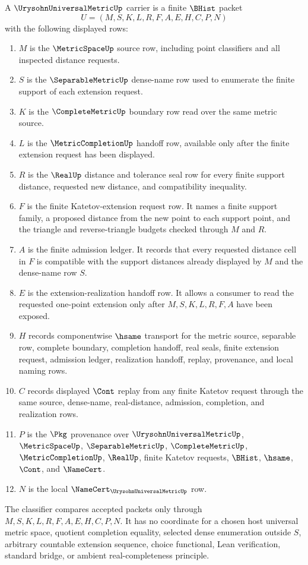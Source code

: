 \begin{definition}\label{def:urysohn-universal-metric-finite-extension-carrier}
A $\UrysohnUniversalMetricUp$ carrier is a finite $\BHist$ packet
$$
U=(M,S,K,L,R,F,A,E,H,C,P,N)
$$
with the following displayed rows:
\begin{enumerate}
\item $M$ is the $\MetricSpaceUp$ source row, including point classifiers and all inspected distance requests.
\item $S$ is the $\SeparableMetricUp$ dense-name row used to enumerate the finite support of each extension request.
\item $K$ is the $\CompleteMetricUp$ boundary row read over the same metric source.
\item $L$ is the $\MetricCompletionUp$ handoff row, available only after the finite extension request has been displayed.
\item $R$ is the $\RealUp$ distance and tolerance seal row for every finite support distance, requested new distance, and compatibility inequality.
\item $F$ is the finite Katetov-extension request row. It names a finite support family, a proposed distance from the new point to each support point, and the triangle and reverse-triangle budgets checked through $M$ and $R$.
\item $A$ is the finite admission ledger. It records that every requested distance cell in $F$ is compatible with the support distances already displayed by $M$ and the dense-name row $S$.
\item $E$ is the extension-realization handoff row. It allows a consumer to read the requested one-point extension only after $M,S,K,L,R,F,A$ have been exposed.
\item $H$ records componentwise $\hsame$ transport for the metric source, separable row, complete boundary, completion handoff, real seals, finite extension request, admission ledger, realization handoff, replay, provenance, and local naming rows.
\item $C$ records displayed $\Cont$ replay from any finite Katetov request through the same source, dense-name, real-distance, admission, completion, and realization rows.
\item $P$ is the $\Pkg$ provenance over $\UrysohnUniversalMetricUp$, $\MetricSpaceUp$, $\SeparableMetricUp$, $\CompleteMetricUp$, $\MetricCompletionUp$, $\RealUp$, finite Katetov requests, $\BHist$, $\hsame$, $\Cont$, and $\NameCert$.
\item $N$ is the local $\NameCert_{\UrysohnUniversalMetricUp}$ row.
\end{enumerate}
The classifier compares accepted packets only through $M,S,K,L,R,F,A,E,H,C,P,N$. It has no coordinate for a chosen host universal metric space, quotient completion equality, selected dense enumeration outside $S$, arbitrary countable extension sequence, choice functional, Lean verification, standard bridge, or ambient real-completeness principle.
\end{definition}


